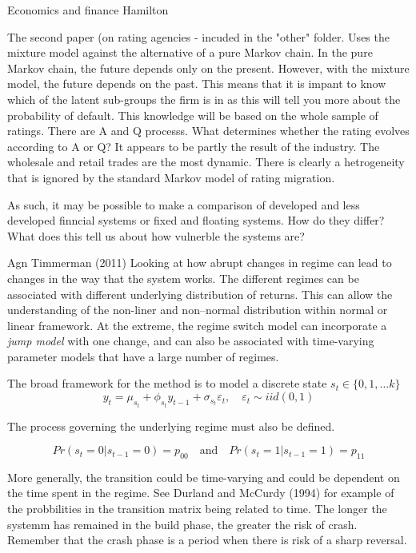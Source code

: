 \documentclass[12pt, a4paper, oneside]{article} %
\begin{document}
Economics and finance
Hamilton

The second paper (on rating agencies - incuded in the "other" folder.  Uses the mixture model against the alternative of a pure Markov chain. In the pure Markov chain, the future depends only on the present.  However, with the mixture model, the future depends on the past.  This means that it is impant to know which of the latent sub-groups the firm is in as this will tell you more about the probability of default.  This knowledge will be based on the whole sample of ratings. There are A and Q processs.  What determines whether the rating evolves according to A or Q?  It appears to be partly the result of the industry.  The wholesale and retail trades are the most dynamic. There is clearly a hetrogeneity that is ignored by the standard Markov model of rating migration. 

As such, it may be possible to make a comparison of developed and less developed finncial systems or fixed and floating systems.  How do they differ?  What does this tell us about how vulnerble the systems are?  


Agn Timmerman (2011)
Looking at how abrupt changes in regime can lead to changes in the way that the system works.  The different regimes can be associated with different underlying distribution of returns.  This can allow the understanding of the non-liner and non--normal distribution within  normal or linear framework.  At the extreme, the regime switch model can incorporate a \emph{jump model} with one change, and can also be associated with time-varying parameter models that have a large number of regimes.

The broad framework for the method is to model a discrete state $s_t \in \{0,1,\dots k \}$
\begin{equation}
y_t = \mu_{s_t} + \phi_{s_t} y_{t-1} + \sigma_{s_t} \varepsilon_t, \quad \varepsilon_t \sim iid(0,1) 
\end{equation}

The process governing the underlying regime must also be defined. 

\begin{equation}
Pr(s_t = 0| s_{t-1} = 0) = p_{00} \quad \text{and} \quad Pr(s_t = 1| s_{t-1} = 1) = p_{11}
\end{equation}

More generally, the transition could be time-varying and could be dependent on the time spent in the regime.  See Durland and McCurdy (1994) for example of the probbilities  in the transition matrix being related to time. The longer the systemm has remained in the build phase, the greater the risk of crash.  Remember that the crash phase is a period when there is risk of a sharp reversal.  
\end{document}
